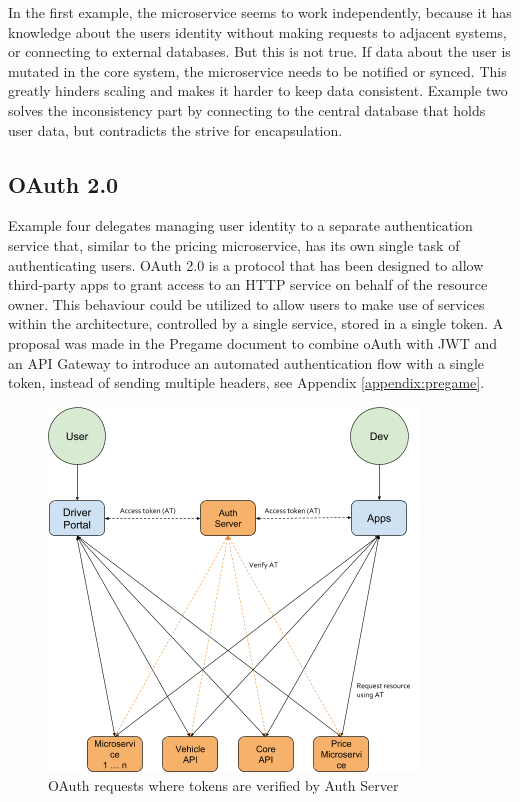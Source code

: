 In the first example, the microservice seems to work independently, because it has knowledge about the users identity without making requests to adjacent systems, or connecting to external databases. But this is not true. If data about the user is mutated in the core system, the microservice needs to be notified or synced. This greatly hinders scaling and makes it harder to keep data consistent. Example two solves the inconsistency part by connecting to the central database that holds user data, but contradicts the strive for encapsulation.

\subsection{OAuth 2.0}
Example four delegates managing user identity to a separate authentication service that, similar to the pricing microservice, has its own single task of authenticating users. OAuth 2.0 is a protocol that has been designed to allow third-party apps to grant access to an HTTP service on behalf of the resource owner. This behaviour could be utilized to allow users to make use of services within the architecture, controlled by a single service, stored in a single token. A proposal was made in the Pregame document to combine oAuth with JWT and an API Gateway to introduce an automated authentication flow with a single token, instead of sending multiple headers, see Appendix \ref{appendix:pregame}.

\begin{figure}[H]
	\centering
	\includegraphics[width=.7\textwidth]{Auth1}
	\caption[OAuth 2.0]{OAuth requests where tokens are verified by Auth Server}
	\label{fig:Auth1}
\end{figure}

